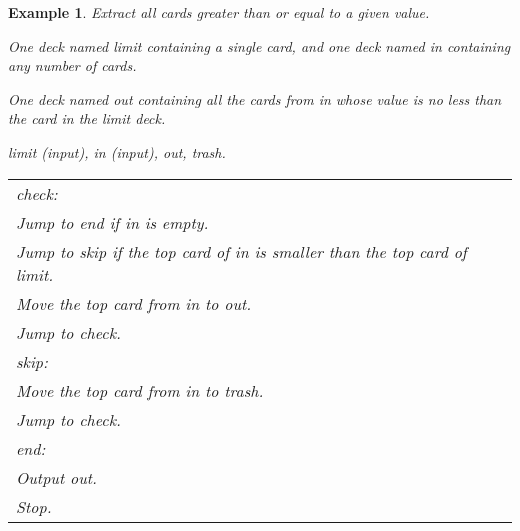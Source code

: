 \documentclass[a4paper,twoside]{tufte-handout}
\newtheorem{example}{Example}
\newcommand\lbl[1]{\hspace{-1em}\emph{#1:}}
\begin{document}
\begin{example}
  Extract all cards greater than or equal to a given value.
  \begin{description}
  \item[Input:] One deck named \emph{limit} containing a single card,
    and one deck named \emph{in} containing any number of cards.
  \item[Output:] One deck named \emph{out} containing all the cards
    from \emph{in} whose value is no less than the card in the
    \emph{limit} deck.
  \item[Decks:] \emph{limit} (input), \emph{in} (input), \emph{out}, \emph{trash}.


\clearpage

 \item[Algorithm:]
  \item\normalfont
    \begin{tabular}{l}
      \lbl{check}\\
      Jump to \emph{end} if \emph{in} is empty.\\
      Jump to \emph{skip} if the top card of \emph{in} is smaller than
      the top card of \emph{limit}.\\
      Move the top card from \emph{in} to \emph{out}.\\
      Jump to \emph{check}.\\
      \lbl{skip}\\
      Move the top card from \emph{in} to \emph{trash}.\\
      Jump to \emph{check}.\\
      \lbl{end}\\
      Output \emph{out}.\\
      Stop.
    \end{tabular}
  \end{description}
\end{example}
\end{document}

